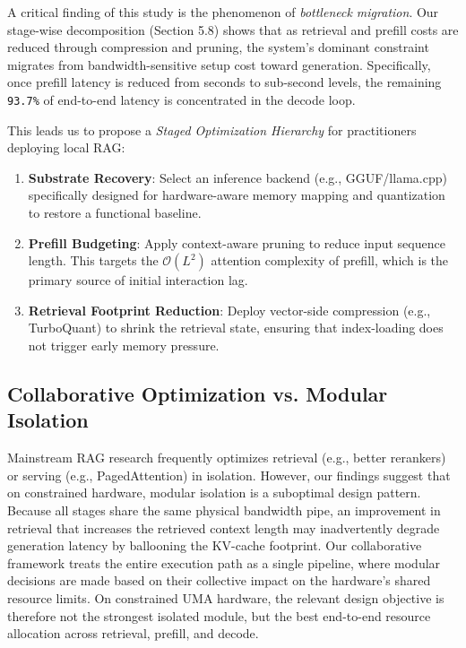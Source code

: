 \documentclass[10pt,twocolumn]{article}
\begin{document}
A critical finding of this study is the phenomenon of \emph{bottleneck migration}. Our stage-wise decomposition (Section 5.8) shows that as retrieval and prefill costs are reduced through compression and pruning, the system's dominant constraint migrates from bandwidth-sensitive setup cost toward generation. Specifically, once prefill latency is reduced from seconds to sub-second levels, the remaining \texttt{93.7\%} of end-to-end latency is concentrated in the decode loop.

This leads us to propose a \emph{Staged Optimization Hierarchy} for practitioners deploying local RAG:
\begin{enumerate}[leftmargin=1.5em, itemsep=0pt]
    \item \textbf{Substrate Recovery}: Select an inference backend (e.g., GGUF/llama.cpp) specifically designed for hardware-aware memory mapping and quantization to restore a functional baseline.
    \item \textbf{Prefill Budgeting}: Apply context-aware pruning to reduce input sequence length. This targets the $\mathcal{O}(L^2)$ attention complexity of prefill, which is the primary source of initial interaction lag.
    \item \textbf{Retrieval Footprint Reduction}: Deploy vector-side compression (e.g., TurboQuant) to shrink the retrieval state, ensuring that index-loading does not trigger early memory pressure.
\end{enumerate}

\subsection{Collaborative Optimization vs. Modular Isolation}

Mainstream RAG research frequently optimizes retrieval (e.g., better rerankers) or serving (e.g., PagedAttention) in isolation. However, our findings suggest that on constrained hardware, modular isolation is a suboptimal design pattern. Because all stages share the same physical bandwidth pipe, an improvement in retrieval that increases the retrieved context length may inadvertently degrade generation latency by ballooning the KV-cache footprint. Our collaborative framework treats the entire execution path as a single pipeline, where modular decisions are made based on their collective impact on the hardware's shared resource limits. On constrained UMA hardware, the relevant design objective is therefore not the strongest isolated module, but the best end-to-end resource allocation across retrieval, prefill, and decode.
\end{document}
